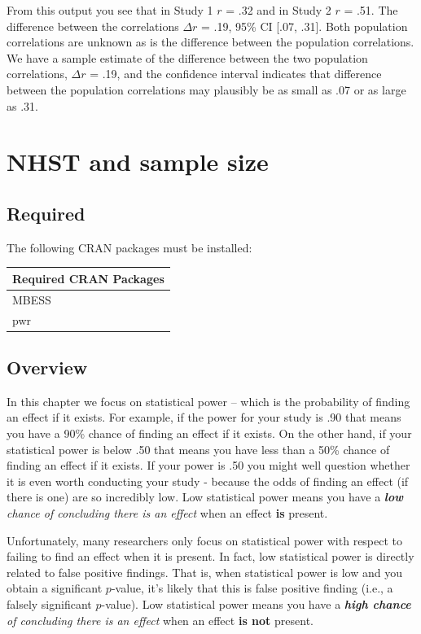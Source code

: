 \documentclass[
]{krantz}
\begin{document}
From this output you see that in Study 1 \(r\) = .32 and in Study 2 \(r\) = .51. The difference between the correlations \(\Delta r\) = .19, 95\% CI {[}.07, .31{]}. Both population correlations are unknown as is the difference between the population correlations. We have a sample estimate of the difference between the two population correlations, \(\Delta r\) = .19, and the confidence interval indicates that difference between the population correlations may plausibly be as small as .07 or as large as .31.

\hypertarget{nhst-and-sample-size}{%
\chapter{NHST and sample size}\label{nhst-and-sample-size}}

\hypertarget{required-4}{%
\section{Required}\label{required-4}}

The following CRAN packages must be installed:

\begin{longtable}[]{@{}l@{}}
\toprule
Required CRAN Packages \\
\midrule
\endhead
MBESS \\
pwr \\
\bottomrule
\end{longtable}

\hypertarget{overview-4}{%
\section{Overview}\label{overview-4}}

In this chapter we focus on statistical power -- which is the probability of finding an effect if it exists. For example, if the power for your study is .90 that means you have a 90\% chance of finding an effect if it exists. On the other hand, if your statistical power is below .50 that means you have less than a 50\% chance of finding an effect if it exists. If your power is .50 you might well question whether it is even worth conducting your study - because the odds of finding an effect (if there is one) are so incredibly low. Low statistical power means you have a \emph{\textbf{low} chance of concluding there is an effect} when an effect \textbf{is} present.

Unfortunately, many researchers only focus on statistical power with respect to failing to find an effect when it is present. In fact, low statistical power is directly related to false positive findings. That is, when statistical power is low and you obtain a significant \(p\)-value, it's likely that this is false positive finding (i.e., a falsely significant \(p\)-value). Low statistical power means you have a \emph{\textbf{high chance} of concluding there is an effect} when an effect \textbf{is not} present.
\end{document}
